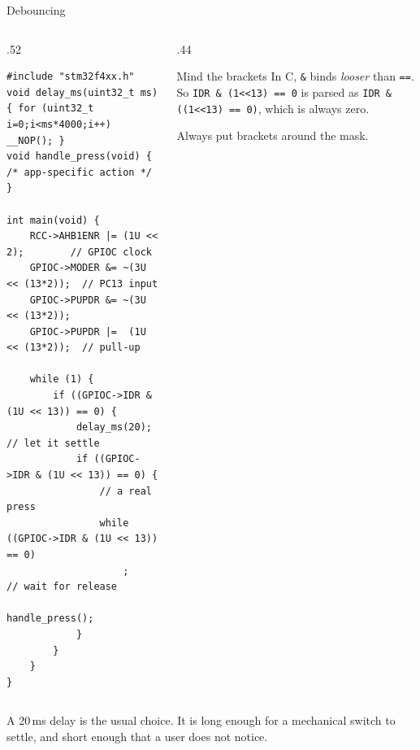 \documentclass[9pt,aspectratio=169,xcolor=table]{beamer}
\begin{document}
\begin{frame}[fragile]{Debouncing}
    \begin{columns}[T]
    \begin{column}{.52\textwidth}
\begin{lstlisting}[style=myc, basicstyle=\ttfamily\scriptsize]
#include "stm32f4xx.h"
void delay_ms(uint32_t ms) { for (uint32_t i=0;i<ms*4000;i++) __NOP(); }
void handle_press(void) { /* app-specific action */ }

int main(void) {
    RCC->AHB1ENR |= (1U << 2);        // GPIOC clock
    GPIOC->MODER &= ~(3U << (13*2));  // PC13 input
    GPIOC->PUPDR &= ~(3U << (13*2));
    GPIOC->PUPDR |=  (1U << (13*2));  // pull-up

    while (1) {
        if ((GPIOC->IDR & (1U << 13)) == 0) {
            delay_ms(20);              // let it settle
            if ((GPIOC->IDR & (1U << 13)) == 0) {
                // a real press
                while ((GPIOC->IDR & (1U << 13)) == 0)
                    ;                  // wait for release
                handle_press();
            }
        }
    }
}
\end{lstlisting}
    \end{column}
    \begin{column}{.44\textwidth}
        \begin{block}{Mind the brackets}
            In C, \texttt{\&} binds \emph{looser} than \texttt{==}. So
            \texttt{IDR \& (1<<13) == 0} is parsed as
            \texttt{IDR \& ((1<<13) == 0)}, which is always zero.

            \vspace{2mm}
            \alert{Always put brackets around the mask.}
        \end{block}
    \end{column}
    \end{columns}

    \vspace{2mm}
    {\small A 20\,ms delay is the usual choice. It is long enough for a
    mechanical switch to settle, and short enough that a user does not
    notice.}
\end{frame}
\end{document}
